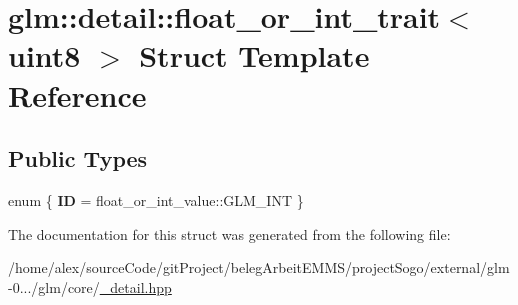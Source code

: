 \hypertarget{structglm_1_1detail_1_1float__or__int__trait_3_01uint8_01_4}{\section{glm\-:\-:detail\-:\-:float\-\_\-or\-\_\-int\-\_\-trait$<$ uint8 $>$ Struct Template Reference}
\label{structglm_1_1detail_1_1float__or__int__trait_3_01uint8_01_4}
}
\subsection*{Public Types}
\begin{DoxyCompactItemize}
\item 
enum \{ {\bfseries I\-D} = float\-\_\-or\-\_\-int\-\_\-value\-:\-:G\-L\-M\-\_\-\-I\-N\-T
 \}
\end{DoxyCompactItemize}


The documentation for this struct was generated from the following file\-:\begin{DoxyCompactItemize}
\item 
/home/alex/source\-Code/git\-Project/beleg\-Arbeit\-E\-M\-M\-S/project\-Sogo/external/glm-\/0.../glm/core/\hyperlink{__detail_8hpp}{\-\_\-detail.\-hpp}\end{DoxyCompactItemize}
